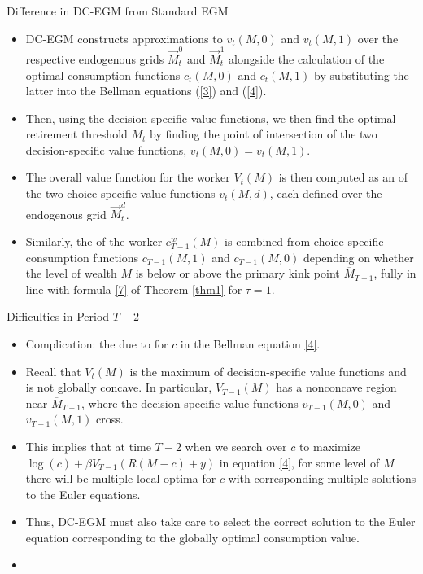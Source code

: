 \documentclass[aspectratio=169]{beamer}
\newcommand{\highlight}[1]{{\color{red}{#1}}}
\begin{document}
\begin{frame}{Difference in DC-EGM from Standard EGM}\small
	\begin{itemize}
		\item DC-EGM constructs approximations to $v_t(M,0)$ and $v_t(M, 1)$ over the respective endogenous grids $\overrightarrow{M}_t^0$ and $\overrightarrow{M}_t^1$ alongside the calculation of the optimal consumption functions $c_t(M, 0)$ and $c_t(M, 1)$ by substituting the latter into the Bellman equations (\ref{3}) and (\ref{4}). 
		\item Then, using the decision-specific value functions, we then find the optimal retirement threshold $\overline{M}_t$ by finding the point of intersection of the two decision-specific value functions, $v_t(M,0) = v_t(M, 1)$.
		\item The overall value function for the worker $V_t(M)$ is then computed as an \highlight{upper envelope} of the two choice-specific value functions $v_t(M, d)$, each defined over the endogenous grid $\overrightarrow{M}_t^d$.
		\item Similarly, the \highlight{optimal consumption function} of the worker $c_{T-1}^w(M)$ is combined from choice-specific consumption functions $c_{T-1}(M,1)$ and $c_{T-1}(M,0)$ depending on whether the level of wealth $M$ is below or above the primary kink point $\overline{M}_{T-1}$, fully in line with formula \ref{7} of Theorem \ref{thm1} for $\tau=1$.
	\end{itemize}
\end{frame}



\begin{frame}{Difficulties in Period $T-2$}
	\begin{itemize}
		\item Complication: the \highlight{emergence of secondary kinks} due to \highlight{multiple local optima} for $c$ in the Bellman equation \ref{4}.
		\item Recall that $V_t(M)$ is the maximum of decision-specific value functions and is not globally concave. In particular, $V_{T-1}(M)$ has a nonconcave region near $\overline{M}_{T-1}$, where the decision-specific value functions $v_{T-1}(M,0)$ and $v_{T-1}(M,1)$ cross.
		\item This implies that at time $T-2$ when we search over $c$ to maximize $\log(c) + \beta V_{T-1}(R(M-c)+y)$ in equation \ref{4}, for some level of $M$ there will be multiple local optima for $c$ with corresponding multiple solutions to the Euler equations.
		\item Thus, DC-EGM must also take care to select the correct solution to the Euler equation corresponding to the globally optimal consumption value.
		\item \highlight{This is achieved by the calculation of the upper envelope over the overlapping segments of the decision-specific value functions that are produced from different solutions. The dominated grid points are then eliminated from the endogenous grid in a way below.}
		
	\end{itemize}
\end{frame}
\end{document}
